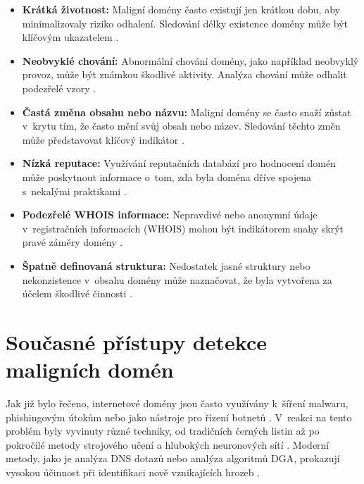 \begin{itemize}
    \item \textbf{Krátká životnost:} Maligní domény často existují jen krátkou dobu, aby minimalizovaly riziko odhalení. Sledování délky existence domény může být klíčovým ukazatelem \cite{zhauniarovich2018survey}.
    
    \item \textbf{Neobvyklé chování:} Abnormální chování domény, jako například neobvyklý provoz, může být známkou škodlivé aktivity. Analýza chování může odhalit podezřelé vzory \cite{bilge2011exposure}.
    
    \item \textbf{Častá změna obsahu nebo názvu:} Maligní domény se často snaží zůstat v~krytu tím, že často mění svůj obsah nebo název. Sledování těchto změn může představovat klíčový indikátor \cite{zhauniarovich2018survey}.
    
    \item \textbf{Nízká reputace:} Využívání reputačních databází pro hodnocení domén může poskytnout informace o~tom, zda byla doména dříve spojena s~nekalými praktikami \cite{antonakakis2010building}.
    
    \item \textbf{Podezřelé WHOIS informace:} Nepravdivé nebo anonymní údaje v~registračních informacích (WHOIS) mohou být indikátorem snahy skrýt pravé záměry domény \cite{bilge2011exposure}.
    
    \item \textbf{Špatně definovaná struktura:} Nedostatek jasné struktury nebo nekonzistence v~obsahu domény může naznačovat, že byla vytvořena za účelem škodlivé činnosti \cite{zhauniarovich2018survey}.
\end{itemize}

\section{Současné přístupy detekce maligních domén}

Jak již bylo řečeno, internetové domény jsou často využívány k~šíření malwaru, phishingovým útokům nebo jako nástroje pro řízení botnetů \cite{provos2007virtual, bilge2011exposure}. V~reakci na tento problém byly vyvinuty různé techniky, od tradičních černých listin až po pokročilé metody strojového učení a hlubokých neuronových sítí \cite{ma2011learning, torroledo2018hunting}. Moderní metody, jako je analýza DNS dotazů nebo analýza algoritmů DGA, prokazují vysokou účinnost při identifikaci nově vznikajících hrozeb \cite{bilge2011exposure, plohmann2016comprehensive}.




